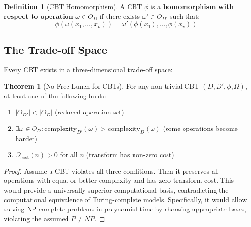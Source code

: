 \documentclass[12pt,a4paper]{article}
\theoremstyle{definition}
\newtheorem{definition}{Definition}
\newtheorem{theorem}{Theorem}
\begin{document}
\begin{definition}[CBT Homomorphism]
A CBT $\phi$ is a \textbf{homomorphism with respect to operation} $\omega \in O_D$ if there exists $\omega' \in O_{D'}$ such that:
\begin{equation}
\phi(\omega(x_1, \ldots, x_n)) = \omega'(\phi(x_1), \ldots, \phi(x_n))
\end{equation}
\end{definition}

\subsection{The Trade-off Space}

Every CBT exists in a three-dimensional trade-off space:

\begin{center}
\end{center}

\begin{theorem}[No Free Lunch for CBTs]
\label{thm:nfl}
For any non-trivial CBT $(D, D', \phi, \Omega)$, at least one of the following holds:
\begin{enumerate}
\item $|O_{D'}| < |O_D|$ (reduced operation set)
\item $\exists \omega \in O_D: \text{complexity}_{D'}(\omega) > \text{complexity}_D(\omega)$ (some operations become harder)
\item $\Omega_{\text{cost}}(n) > 0$ for all $n$ (transform has non-zero cost)
\end{enumerate}
\end{theorem}

\begin{proof}
Assume a CBT violates all three conditions. Then it preserves all operations with equal or better complexity and has zero transform cost. This would provide a universally superior computational basis, contradicting the computational equivalence of Turing-complete models. Specifically, it would allow solving NP-complete problems in polynomial time by choosing appropriate bases, violating the assumed $P \neq NP$.
\end{proof}
\end{document}
